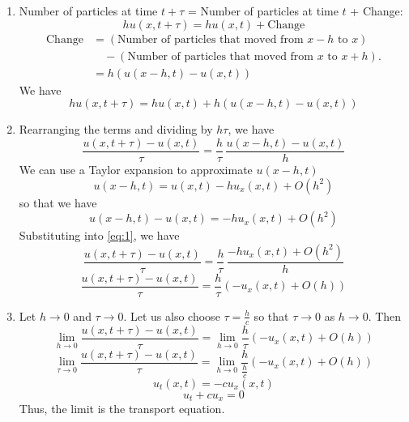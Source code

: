 \documentclass[plain]{pset}
\begin{document}
\begin{solution}
    \[\]
    \vspace*{-4em}
    \begin{enumerate}[label = (\alph*)]
        \item Number of particles at time \(t + \tau\) = Number of particles at time \(t\) + Change:
              \[hu(x, t + \tau) = hu(x, t) + \text{Change}\]
              \begin{align*}
                  \text{Change} & = (\text{Number of particles that moved from } x - h \text{ to } x) \\ &\hspace{1em}- (\text{Number of particles that moved from } x \text{ to } x + h). \\
                                & = h\left(u(x - h, t) - u(x, t)\right)
              \end{align*}
              We have
              \[hu(x, t + \tau) = hu(x, t) + h\left(u(x - h, t) - u(x, t)\right)\]
        \item Rearranging the terms and dividing by \(h\tau\), we have
              \begin{equation} \label{eq:1}
                  \frac{u(x, t + \tau) - u(x, t)}{\tau} = \frac{h}{\tau}\,\frac{u(x - h, t) - u(x, t)}{h}
              \end{equation}
              We can use a Taylor expansion to approximate \(u(x - h, t)\)
              \[u(x - h, t) = u(x, t) - hu_x(x, t) + O(h^2)\]
              so that we have
              \[u(x - h, t) - u(x, t) = -hu_x(x, t) + O(h^2)\]
              Substituting into \eqref{eq:1}, we have
              \[\frac{u(x, t + \tau) - u(x, t)}{\tau} = \frac{h}{\tau}\,\frac{-hu_x(x, t) + O(h^2)}{h}\]
              \[\frac{u(x, t + \tau) - u(x, t)}{\tau} = \frac{h}{\tau}\left(-u_x(x, t) + O(h)\right)\]
        \item Let \(h \to 0\) and \(\tau \to 0\). Let us also choose \(\tau = \frac{h}{c}\) so that \(\tau \rightarrow 0\) as \(h \rightarrow 0\). Then
              \[\lim_{h \to 0}\frac{u(x, t + \tau) - u(x, t)}{\tau} = \lim_{h \to 0}\frac{h}{\tau}\left(-u_x(x, t) + O(h)\right)\]
              \[\lim_{\tau \to 0}\frac{u(x, t + \tau) - u(x, t)}{\tau} = \lim_{h \to 0}\frac{h}{\frac{h}{c}}\left(-u_x(x, t) + O(h)\right)\]
              \[u_t(x, t) = -cu_x(x, t)\]
              \[u_t + cu_x = 0\]
              Thus, the limit is the transport equation.
    \end{enumerate}
\end{solution}
\end{document}
